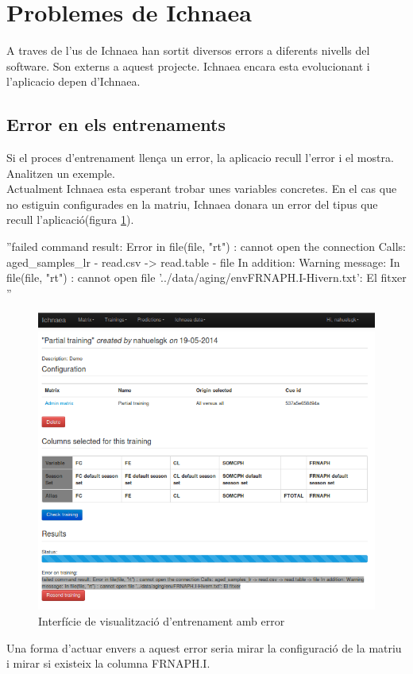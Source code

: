 \section{Problemes de Ichnaea}
\label{sec:ichnaeaErrors}
A traves de l'us de Ichnaea han sortit diversos errors a diferents nivells del software. Son externs a aquest projecte. Ichnaea encara esta evolucionant i l'aplicacio depen d'Ichnaea.

\subsection{Error en els entrenaments}
Si el proces d'entrenament llença un error, la aplicacio recull l'error i el mostra. Analitzen un exemple.\\

Actualment Ichnaea esta esperant trobar unes variables concretes. En el cas que no estiguin configurades en la matriu, Ichnaea donara un error del tipus que recull l'aplicació(figura \ref{fig:viewtrainingerror}).

\begin{center}
''failed command result: Error in file(file, "rt") : cannot open the connection Calls: aged\_samples\_lr - \> read.csv -> read.table -\> file In addition: Warning message: In file(file, "rt") : cannot open file '../data/aging/envFRNAPH.I-Hivern.txt': El fitxer ''
\end{center}

\begin{figure}[h!]
  \centering
  \includegraphics[scale=0.5]{img/userguide/error_training.png}
  \caption{Interfície de visualització d'entrenament amb error}
  \label{fig:viewtrainingerror}
\end{figure}
Una forma d'actuar envers a aquest error seria mirar la configuració de la matriu i mirar si existeix la columna FRNAPH.I.
